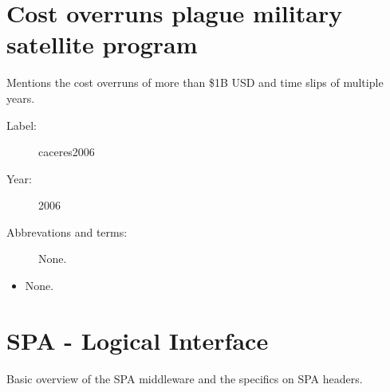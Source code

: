 \section{Cost overruns plague military satellite program}

Mentions the cost overruns of more than \$1B USD and time slips of multiple
years.

\begin{description}
    \item[Label:] caceres2006 \cite{caceres2006}
    \item[Year:] 2006
    \item[Abbrevations and terms:] None.
\end{description}

\begin{itemize}
    \item None. %
\end{itemize}

\section{SPA - Logical Interface}

Basic overview of the SPA middleware and the specifics on SPA headers.

